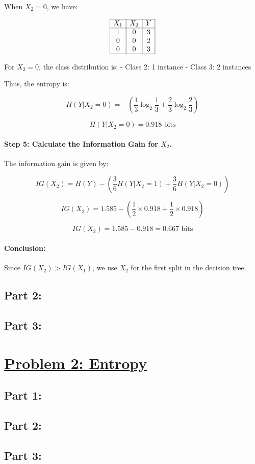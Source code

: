 \documentclass[12pt]{article}
\begin{document}
When $X_2 = 0$, we have:

\[
  \begin{array}{|c|c|c|}
    \hline
    X_1 & X_2 & Y \\
    \hline
    1   & 0   & 3 \\
    0   & 0   & 2 \\
    0   & 0   & 3 \\
    \hline
  \end{array}
\]

For $X_2 = 0$, the class distribution is:
- Class 2: 1 instance
- Class 3: 2 instances

Thus, the entropy is:

\[
  H(Y|X_2 = 0) = -\left( \frac{1}{3} \log_2 \frac{1}{3} + \frac{2}{3} \log_2 \frac{2}{3} \right)
\]

\[
  H(Y|X_2 = 0) = 0.918 \text{ bits}
\]

\paragraph{Step 5: Calculate the Information Gain for $X_2$.}

The information gain is given by:

\[
  IG(X_2) = H(Y) - \left( \frac{3}{6} H(Y|X_2 = 1) + \frac{3}{6} H(Y|X_2 = 0) \right)
\]

\[
  IG(X_2) = 1.585 - \left( \frac{1}{2} \times 0.918 + \frac{1}{2} \times 0.918 \right)
\]

\[
  IG(X_2) = 1.585 - 0.918 = 0.667 \text{ bits}
\]

\paragraph{Conclusion:}
Since $IG(X_2) > IG(X_1)$, we use $X_2$ for the first split in the decision tree.


\subsection*{Part 2:}

\subsection*{Part 3:}


\section*{\underline{Problem 2: Entropy}}

\subsection*{Part 1:}

\subsection*{Part 2:}

\subsection*{Part 3:}
\end{document}
